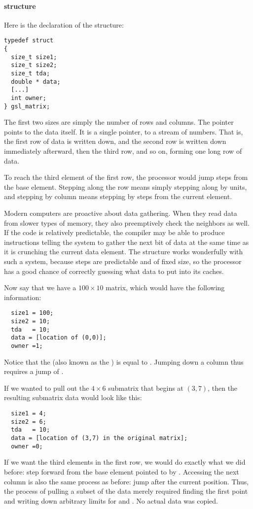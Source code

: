 {\paragraph{ structure}} Here is the declaration of the
 structure:

\begin{lstlisting}
typedef struct
{
  size_t size1;
  size_t size2;
  size_t tda;
  double * data;
  [...]
  int owner;
} gsl_matrix;
\end{lstlisting}

The first two sizes are simply the number of rows and columns. The
 pointer points to the data itself. It is a single pointer, to
a stream of numbers. That is, the first row of data is written down, and
the second row is written down immediately afterward, then the third
row, and so on, forming one long row of data.

To reach the third element of the first row, the processor would jump
 steps from the base element.  Stepping along the row
means simply stepping along by  units, and stepping by
column means stepping by  steps from the current
element. 

Modern computers are proactive about data gathering. When they read data
from slower types of memory, they also preemptively check the neighbors
as well. If the code is relatively predictable, the compiler may be
able to produce instructions telling the system to gather the next bit
of data at the same time as it is crunching the current data element.
The  structure works wonderfully with such a system,
because steps are predictable and of fixed size, so the processor
has a good chance of correctly guessing what data to put into its
caches.

Now say that we have a $100 \times 10$ matrix, which would have the following information:
\begin{lstlisting}
  size1 = 100;
  size2 = 10;
  tda   = 10;
  data = [location of (0,0)];
  owner =1;
\end{lstlisting}
Notice that the   (also known as the ) is equal to
. Jumping down a column thus requires a jump of
.


If we wanted to pull out the $4 \times 6$ submatrix that begins at $(3, 7)$, then
the resulting submatrix data would look like this:
\begin{lstlisting}
  size1 = 4;
  size2 = 6;
  tda   = 10;
  data = [location of (3,7) in the original matrix];
  owner =0;
\end{lstlisting}
If we want the third elements in the first row, we would do exactly
what we did before: step  forward from the base
element pointed to by . Accessing the next column is also the
same process as before: jump  after the current
position. Thus, the process of pulling a subset of the data merely
required finding the first point and writing down arbitrary limits for
 and . No actual data was copied. 

